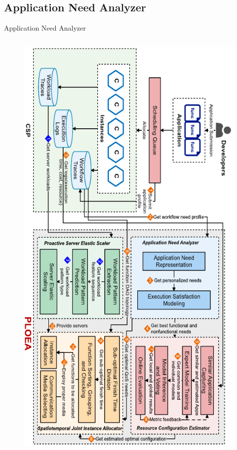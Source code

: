 \documentclass[aspectratio=169]{beamer}
\begin{document}
\subsection{Application Need Analyzer}

\begin{frame}{Application Need Analyzer}\label{label:application-need-analyzer}
  \begin{columns}
    \begin{figure}
      \centering
      \includegraphics[scale=1.5]{img/method/application-need-analyzer.pdf}
    \end{figure}


\end{columns}
\end{frame}
\end{document}
